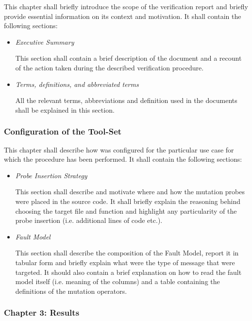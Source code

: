   This chapter shall briefly introduce the scope of the verification report and briefly provide essential information on its context and motivation.
  It shall contain the following sections:
  \begin{itemize}


    \item \emph{Executive Summary}


    This section shall contain a brief description of the document and a recount of the action taken during the described verification procedure.


    \item \emph{Terms, definitions, and abbreviated terms}


    All the relevant terms, abbreviations and definition used in the documents shall be explained in this section.


  \end{itemize}


  \subsubsection{Configuration of the Tool-Set}


  This chapter shall describe how \DAMA was configured for the particular use case for which the procedure has been performed.
  It shall contain the following sections:
  \begin{itemize}


    \item \emph{Probe Insertion Strategy}


    This section shall describe and motivate where and how the mutation probes were placed in the source code. It shall briefly explain the reasoning behind choosing the target file and function and highlight any particularity of the probe insertion (i.e. additional lines of code etc.).


    \item \emph{Fault Model}


    This section shall describe the composition of the Fault Model, report it in tabular form and briefly explain what were the type of message that were targeted. It should also contain a brief explanation on how to read the fault model itself (i.e. meaning of the columns) and a table containing the definitions of the mutation operators.


  \end{itemize}


  \subsubsection{Chapter 3: Results}


